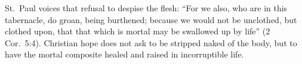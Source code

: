 St.~Paul voices that refusal to despise the flesh: ``For we also, who are in this tabernacle, do groan, being burthened; because we would not be unclothed, but clothed upon, that that which is mortal may be swallowed up by life'' (2 Cor.\ 5:4). Christian hope does not ask to be stripped naked of the body, but to have the mortal composite healed and raised in incorruptible life.
